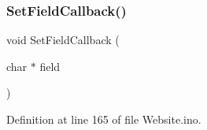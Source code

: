 \mbox{\label{_website_8ino_a6f7efff8f677d80bc137cc399db4a31f}} 
\subsubsection{\texorpdfstring{SetFieldCallback()}{SetFieldCallback()}}
{\footnotesize\ttfamily void Set\+Field\+Callback (\begin{DoxyParamCaption}\item[{char $\ast$}]{field }\end{DoxyParamCaption})}



Definition at line 165 of file Website.\+ino.

